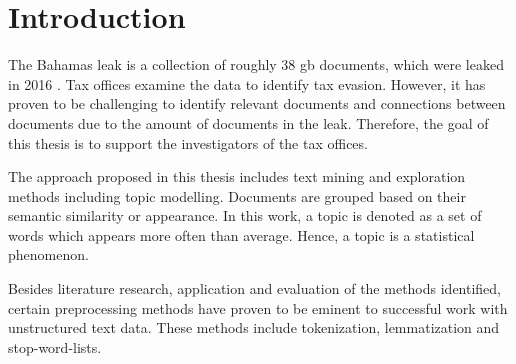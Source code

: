 \chapter{Introduction}\label{ch:introduction}

The Bahamas leak is a collection of roughly 38 \ac{gb} documents, which were leaked in 2016 \cite{data-corpus-bahamas-leaks}.
Tax offices examine the data to identify tax evasion.
However, it has proven to be challenging to identify relevant documents and connections between documents due to the amount of documents in the leak.
Therefore, the goal of this thesis is to support the investigators of the tax offices.

The approach proposed in this thesis includes text mining and exploration methods including topic modelling.
Documents are grouped based on their semantic similarity or appearance.
In this work, a topic is denoted as a set of words which appears more often than average.
Hence, a topic is a statistical phenomenon.

Besides literature research, application and evaluation of the methods identified, 
certain preprocessing methods have proven to be eminent to successful work with unstructured text data.
These methods include tokenization, lemmatization and stop-word-lists.